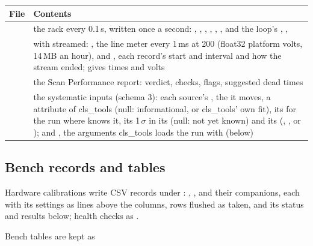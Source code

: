 \begin{center}
\small
\begin{tabularx}{\textwidth}{@{}lL@{}}
\toprule
File & Contents \\
\midrule
{} & the rack every 0.1\,s, written once a second: ,
    , , , ,
    , and the loop's , ,  \\
 & with  streamed: ,
    the line meter every 1\,ms at 200\us{} (float32 platform volts, 14\,MB an hour),
    and , each record's start and interval and how the stream ended;
     gives times and volts \\
 & the Scan Performance report: verdict, checks, flags,
    suggested dead times \\
 & the systematic inputs (schema 3): each source's
    , the  it moves, a  attribute of cls\_tools (null:
    informational, or cls\_tools' own fit), its  for the run where \oracle{}
    knows it, its 1\,$\sigma$  in its  (null: not yet known) and
    its  (, ,  or );
    and , the arguments cls\_tools loads the run with (below) \\
\bottomrule
\end{tabularx}
\end{center}

\subsection{Bench records and tables}

Hardware calibrations write CSV records under :
, ,  and their companions, each with its
settings as \code{\#} lines above the columns, rows flushed as taken, and its status and
results below; health checks as .

Bench tables are kept as

\begin{center}
\end{center}

